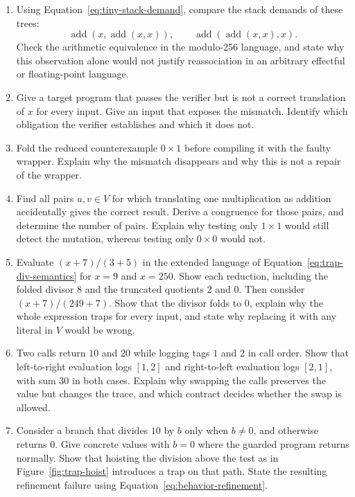 \begin{enumerate}
  \item \label{ex:tiny-stack-demand}
  Using Equation~\ref{eq:tiny-stack-demand}, compare the stack demands of these trees:
  \[
    \operatorname{add}(x,\operatorname{add}(x,x)),
    \qquad
    \operatorname{add}(\operatorname{add}(x,x),x).
  \]
  Check the arithmetic equivalence in the modulo-256 language, and state why this observation alone would not justify reassociation in an arbitrary effectful or floating-point language.

  \item \label{ex:tiny-stack-valid-wrong}
  Give a target program that passes the verifier but is not a correct translation of $x$ for every input.
  Give an input that exposes the mismatch.
  Identify which obligation the verifier establishes and which it does not.
  \item \label{ex:tiny-mutant-hidden}
  Fold the reduced counterexample $0\times1$ before compiling it with the faulty wrapper.
  Explain why the mismatch disappears and why this is not a repair of the wrapper.

  \item \label{ex:tiny-mutant-agreement}
  Find all pairs $u,v\in V$ for which translating one multiplication as addition accidentally gives the correct result.
  Derive a congruence for those pairs, and determine the number of pairs.
  Explain why testing only $1\times1$ would still detect the mutation, whereas testing only $0\times0$ would not.

  \item \label{ex:trap-div-zero}
  Evaluate $(x+7)/(3+5)$ in the extended language of Equation~\ref{eq:trap-div-semantics} for $x=9$ and $x=250$.
  Show each reduction, including the folded divisor $8$ and the truncated quotients $2$ and $0$.
  Then consider $(x+7)/(249+7)$.
  Show that the divisor folds to $0$, explain why the whole expression traps for every input, and state why replacing it with any literal in $V$ would be wrong.

  \item \label{ex:trap-effect-swap}
  Two calls return $10$ and $20$ while logging tags $1$ and $2$ in call order.
  Show that left-to-right evaluation logs $[1,2]$ and right-to-left evaluation logs $[2,1]$, with sum $30$ in both cases.
  Explain why swapping the calls preserves the value but changes the trace, and which contract decides whether the swap is allowed.

  \item \label{ex:trap-hoist-branch}
  Consider a branch that divides $10$ by $b$ only when $b\neq0$, and otherwise returns $0$.
  Give concrete values with $b=0$ where the guarded program returns normally.
  Show that hoisting the division above the test as in Figure~\ref{fig:trap-hoist} introduces a trap on that path.
  State the resulting refinement failure using Equation~\ref{eq:behavior-refinement}.
\end{enumerate}

